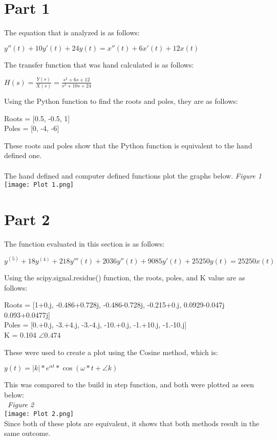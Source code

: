 \documentclass[12pt,a4paper]{article}
\begin{document}
\section{Part 1}
The equation that is analyzed is as follows:
\begin{center}
    $y''(t) + 10y'(t) + 24y(t) = x''(t) + 6x'(t) + 12x(t)$
\end{center}
The transfer function that was hand calculated is as follows:
\begin{center}
    $H(s)=\frac{Y(s)}{X(s)}=\frac{s^2+6s+12}{s^2+10s+24}$
\end{center}
Using the Python function to find the roots and poles, they are as follows:\\
\begin{center}
    Roots = [0.5, -0.5, 1]\\
    Poles = [0, -4, -6]\\
\end{center}
These roots and poles show that the Python function is equivalent to the hand defined one.\\
\\
The hand defined and computer defined functions plot the graphs below.
\newpage
\textit{Figure 1}
\\
\texttt{[image: Plot 1.png]}
\newpage
\section{Part 2}
The function evaluated in this section is as follows:
\begin{center}
    $y^{(5)} + 18y^{(4)} + 218y'''(t) + 2036y''(t) + 9085y'(t) + 25250y(t) = 25250x(t)$
\end{center}
Using the scipy.signal.residue() function, the roots, poles, and K value are as follows:
\begin{center}
    Roots = [1+0.j, -0.486+0.728j, -0.486-0.728j, -0.215+0.j,  0.0929-0.047j  0.093+0.0477j]\\
    Poles = [0.+0.j, -3.+4.j, -3.-4.j, -10.+0.j, -1.+10.j, -1.-10.j]\\
    K = 0.104 $\angle 0.474$ 
\end{center}
These were used to create a plot using the Cosine method, which is:\\
\begin{center}
    $y(t)=\vert k \vert * e^{\alpha t} * \cos{(\omega * t + \angle k)}$
\end{center}
This was compared to the build in step function, and both were plotted as seen below:\\
\
\textit{Figure 2}
\\
\texttt{[image: Plot 2.png]}
\\
Since both of these plots are equivalent, it shows that both methods result in the same outcome.
\newpage
\end{document}
